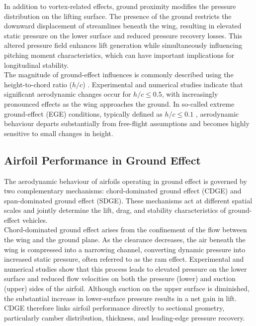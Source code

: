 \noindent In addition to vortex-related effects, ground proximity modifies the pressure distribution on the lifting surface. The presence of the ground restricts the downward displacement of streamlines beneath the wing, resulting in elevated static pressure on the lower surface and reduced pressure recovery losses. This altered pressure field enhances lift generation while simultaneously influencing pitching moment characteristics, which can have important implications for longitudinal stability.\\

\noindent The magnitude of ground-effect influences is commonly described using the height-to-chord ratio ($h/c$) \cite{ELSEVIER_transonic_and_supersonic}. Experimental and numerical studies indicate that significant aerodynamic changes occur for $h/c \leq 0.5$, with increasingly pronounced effects as the wing approaches the ground. In so-called extreme ground-effect (EGE) conditions, typically defined as $h/c \leq 0.1$ \cite{WIGE-vehicles}, aerodynamic behaviour departs substantially from free-flight assumptions and becomes highly sensitive to small changes in height.\\

\subsection{Airfoil Performance in Ground Effect}

The aerodynamic behaviour of airfoils operating in ground effect is governed by two complementary mechanisms: chord-dominated ground effect (CDGE) and span-dominated ground effect (SDGE). These mechanisms act at different spatial scales and jointly determine the lift, drag, and stability characteristics of ground-effect vehicles.\\

\noindent Chord-dominated ground effect arises from the confinement of the flow between the wing and the ground plane. As the clearance decreases, the air beneath the wing is compressed into a narrowing channel, converting dynamic pressure into increased static pressure, often referred to as the ram effect. Experimental and numerical studies show that this process leads to elevated pressure on the lower surface and reduced flow velocities on both the pressure (lower) and suction (upper) sides of the airfoil. Although suction on the upper surface is diminished, the substantial increase in lower-surface pressure results in a net gain in lift. CDGE therefore links airfoil performance directly to sectional geometry, particularly camber distribution, thickness, and leading-edge pressure recovery.\\

